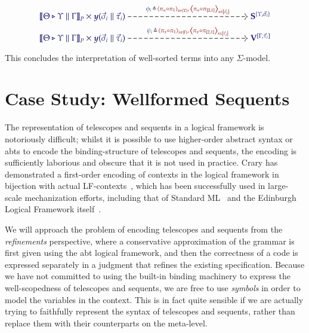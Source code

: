 \documentclass[11pt]{article}
\theoremstyle{definition}
\theoremstyle{remark}
\numberwithin{equation}{section}
\begin{document}
\begin{gather*}
  \begin{tikzcd}[cramped, ampersand replacement = \&]
    {\IMode{
      {\SemBrackets{\Theta\triangleright\Upsilon\parallel\Gamma}}_{P}
      \times
      \Yoneda{\vec{\sigma}_i\parallel\vec{\tau}_i}
    }}
      \arrow[
        , r
        , dashed
        , "
          \Define
            {
              \phi_i\,
            }
            {
              \,
                \Tuple{\pi_u\circ\pi_1}_{u\in\Dom{\Upsilon}}
              ,
                \,\Tuple{\pi_u\circ\pi_{[2,1]}}_{u\in\Dom{\vec{\sigma}_i}}
            }
          "
      ]
\&[12.0em]
    {\IMode{\SymPsh^{\{\Upsilon,\vec{\sigma}_i\}}}}
\\[-1.0em]
    {\IMode{
      {\SemBrackets{
        \Theta\triangleright\Upsilon\parallel\Gamma
      }}_{P}
      \times
      \Yoneda{\vec{\sigma}_i\parallel\vec{\tau}_i}
    }}
      \arrow[
        , r
        , dashed
        , "
          \Define{
            \psi_i\,
          }{
            \,
              \Tuple{\pi_x\circ\pi_1}_{x\in\Dom{\Gamma}}
            ,
              \,\Tuple{\pi_x\circ\pi_{[2,1]}}_{x\in\Dom{\vec{\tau}_i}}
          }
          "
      ]
\&[12.0em]
    {\IMode{\VarPsh^{[\Gamma,\vec{\tau}_i]}}}
  \end{tikzcd}
\end{gather*}

This concludes the interpretation of well-sorted terms into any $\Sigma$-model.

\section{Case Study: Wellformed Sequents}

The representation of telescopes and sequents in a logical framework is
notoriously difficult; whilst it is possible to use higher-order abstract
syntax or abts to encode the binding-structure of telescopes and sequents, the
encoding is sufficiently laborious and obscure that it is not used in practice.
Crary has demonstrated a first-order encoding of contexts in the logical
framework in bijection with actual LF-contexts~\cite{crary:2009}, which has
been successfully used in large-scale mechanization efforts, including that of
Standard ML~\cite{lee-crary-harper:2007} and the Edinburgh Logical Framework
itself~\cite{martens-crary:2012}.

We will approach the problem of encoding telescopes and sequents from the
\emph{refinements} perspective, where a conservative approximation of the
grammar is first given using the abt logical framework, and then the
correctness of a code is expressed separately in a judgment that refines the
existing specification.  Because we have not committed to using the built-in
binding machinery to express the well-scopedness of telescopes and sequents, we
are free to use \emph{symbols} in order to model the variables in the context.
This is in fact quite sensible if we are actually trying to faithfully
represent the syntax of telescopes and sequents, rather than replace them with
their counterparts on the meta-level.
\end{document}
